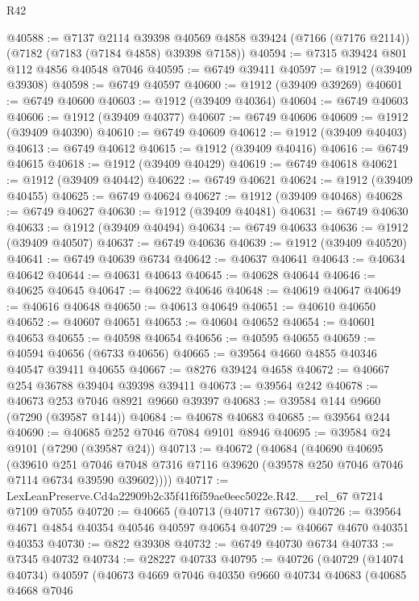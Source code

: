 \begin{lexlean}{R42}
\begin{coremodule}
{@40588 := @7137
    @2114
    @39398
    @40569
    @4858
    @39424
    (@7166 (@7176 @2114))
    (@7182 (@7183 (@7184 @4858) @39398 @7158))
@40594 := @7315 @39424 @801 @112 @4856 @40548 @7046
@40595 := @6749 @39411
@40597 := @1912 (@39409 @39308)
@40598 := @6749 @40597
@40600 := @1912 (@39409 @39269)
@40601 := @6749 @40600
@40603 := @1912 (@39409 @40364)
@40604 := @6749 @40603
@40606 := @1912 (@39409 @40377)
@40607 := @6749 @40606
@40609 := @1912 (@39409 @40390)
@40610 := @6749 @40609
@40612 := @1912 (@39409 @40403)
@40613 := @6749 @40612
@40615 := @1912 (@39409 @40416)
@40616 := @6749 @40615
@40618 := @1912 (@39409 @40429)
@40619 := @6749 @40618
@40621 := @1912 (@39409 @40442)
@40622 := @6749 @40621
@40624 := @1912 (@39409 @40455)
@40625 := @6749 @40624
@40627 := @1912 (@39409 @40468)
@40628 := @6749 @40627
@40630 := @1912 (@39409 @40481)
@40631 := @6749 @40630
@40633 := @1912 (@39409 @40494)
@40634 := @6749 @40633
@40636 := @1912 (@39409 @40507)
@40637 := @6749 @40636
@40639 := @1912 (@39409 @40520)
@40641 := @6749 @40639 @6734
@40642 := @40637 @40641
@40643 := @40634 @40642
@40644 := @40631 @40643
@40645 := @40628 @40644
@40646 := @40625 @40645
@40647 := @40622 @40646
@40648 := @40619 @40647
@40649 := @40616 @40648
@40650 := @40613 @40649
@40651 := @40610 @40650
@40652 := @40607 @40651
@40653 := @40604 @40652
@40654 := @40601 @40653
@40655 := @40598 @40654
@40656 := @40595 @40655
@40659 := @40594 @40656 (@6733 @40656)
@40665 := @39564 @4660 @4855 @40346 @40547 @39411 @40655
@40667 := @8276 @39424 @4658
@40672 := @40667 @254 @36788 @39404 @39398 @39411
@40673 := @39564 @242
@40678 := @40673 @253 @7046 @8921 @9660 @39397
@40683 := @39584 @144 @9660 (@7290 (@39587 @144))
@40684 := @40678 @40683
@40685 := @39564 @244
@40690 := @40685 @252 @7046 @7084 @9101 @8946
@40695 := @39584 @24 @9101 (@7290 (@39587 @24))
@40713 := @40672
    (@40684
      (@40690
        @40695
        (@39610
          @251
          @7046
          @7048
          @7316
          @7116
          @39620
          (@39578 @250 @7046 @7046 @7114 @6734 @39590 @39602))))
@40717 := LexLeanPreserve.Cd4a22909b2c35f41f6f59ae0eec5022e.R42.__rel_67 @7214 @7109 @7055
@40720 := @40665 (@40713 (@40717 @6730))
@40726 := @39564 @4671 @4854 @40354 @40546 @40597 @40654
@40729 := @40667 @4670 @40351 @40353
@40730 := @822 @39308
@40732 := @6749 @40730 @6734
@40733 := @7345 @40732
@40734 := @28227 @40733
@40795 := @40726
    (@40729
      (@14074 @40734)
      @40597
      (@40673
        @4669
        @7046
        @40350
        @9660
        @40734
        @40683
        (@40685
          @4668
          @7046
}
\end{coremodule}
\end{lexlean}
